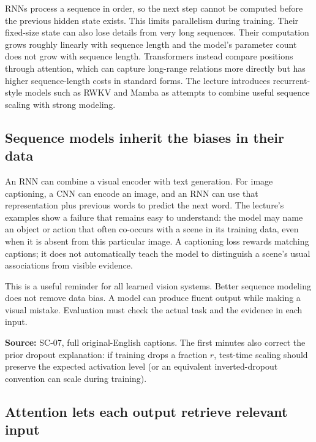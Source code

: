 RNNs process a sequence in order, so the next step cannot be computed before the previous hidden state exists. This limits parallelism during training. Their fixed-size state can also lose details from very long sequences. Their computation grows roughly linearly with sequence length and the model's parameter count does not grow with sequence length. Transformers instead compare positions through attention, which can capture long-range relations more directly but has higher sequence-length costs in standard forms. The lecture introduces recurrent-style models such as RWKV and Mamba as attempts to combine useful sequence scaling with strong modeling.

\subsection{Sequence models inherit the biases in their data}\label{04-visual-computing-ii-ch031-sequence-models-inherit-the-biases-in-their-data}

An RNN can combine a visual encoder with text generation. For image captioning, a CNN can encode an image, and an RNN can use that representation plus previous words to predict the next word. The lecture's examples show a failure that remains easy to understand: the model may name an object or action that often co-occurs with a scene in its training data, even when it is absent from this particular image. A captioning loss rewards matching captions; it does not automatically teach the model to distinguish a scene's usual associations from visible evidence.

This is a useful reminder for all learned vision systems. Better sequence modeling does not remove data bias. A model can produce fluent output while making a visual mistake. Evaluation must check the actual task and the evidence in each input.

\textbf{Source:} SC-07, full original-English captions. The first minutes also correct the prior dropout explanation: if training drops a fraction \(r\), test-time scaling should preserve the expected activation level (or an equivalent inverted-dropout convention can scale during training).

\subsection{Attention lets each output retrieve relevant input}\label{04-visual-computing-ii-ch031-attention-lets-each-output-retrieve-relevant-input}


